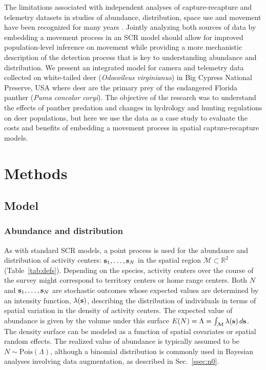 \documentclass[12pt]{article}
\newcommand{\bs}{{\bf s}}
\begin{document}
The limitations associated with independent analyses of
capture-recapture and telemetry datasets in studies of 
abundance, distribution, space use and movement have been recognized
for many years \citep[pp. 534--535]{royle_etal:2014}.
Jointly analyzing both sources of data by embedding a movement process
in an SCR model should allow for improved population-level inference
on movement while providing a more mechanistic description of the
detection process that is key to understanding abundance and
distribution. We present an integrated model for camera and telemetry
data  collected on white-tailed deer  ({\it Odocoileus virginianus}) in
Big Cypress National Preserve, USA where deer are the primary prey of
the endangered Florida panther ({\it Puma concolor coryi}). 
The objective of the research was to understand the effects of panther
predation and changes in hydrology and hunting regulations on deer
populations, but here we use the data as a case study to evaluate the
costs and benefits of embedding a movement process in spatial
capture-recapture models. 


\section{Methods}

\subsection{Model}

\subsubsection{Abundance and distribution}

As with standard SCR models, a point process is used for the 
abundance and distribution of activity centers: $\bs_1, \dots, \bs_N$
in the spatial region $\mathcal{M} \subset \mathbb{R}^2$
(Table~\ref{tab:defs}). Depending on the species, activity centers
over the course of the survey might correspond to territory centers or 
home range centers. Both $N$ and $\bs_1, \dots, \bs_N$ are
stochastic outcomes whose expected values are determined by an
intensity function, $\lambda(\bs)$, describing the distribution of
individuals in terms of spatial variation in the density of activity
centers. The expected value of abundance is given by  the volume under
this surface $E(N) = \Lambda = \int_{\mathcal{M}} \lambda(\bs) \, d\bs$.
The density surface can be modeled as a function of spatial covariates
or spatial random effects. The realized value of abundance is
typically assumed to be $N \sim \mathrm{Pois}(\Lambda)$, although a
binomial distribution is commonly used in Bayesian analyses involving
data augmentation, as described in Sec.~\ref{ssec:n0}. 
\end{document}
